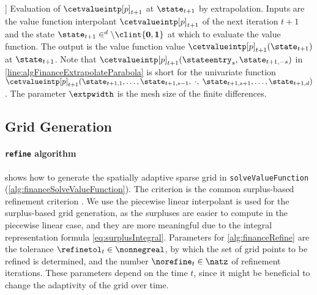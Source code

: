 \begin{algorithm}
  ]{%
    Evaluation of $\cetvalueintp[p]_{t+1}$ at $\state_{t+1}$
    by extrapolation.
    Inputs are
    the value function interpolant $\cetvalueintp[p]_{t+1}$
    of the next iteration $t + 1$ and
    the state $\state_{t+1} \in \real^d \setminus \clint{\*0, \*1}$
    at which to evaluate the value function.
    The output is
    the value function value $\cetvalueintp[p]_{t+1}(\state_{t+1})$
    at $\state_{t+1}$.
    Note that $\cetvalueintp[p]_{t+1}(\stateentry_s, \*\state_{t+1,-s})$
    in \cref{line:algFinanceExtrapolateParabola} is short for
    the univariate function $\cetvalueintp[p]_{t+1}(
      \state_{t+1,1}, \dotsc, \state_{t+1,s-1},\; {\cdot},\;
      \state_{t+1,s+1}, \dotsc, \state_{t+1,d}
    )$.
    The parameter $\extpwidth$ is the mesh size of the finite differences.%
  }%
  \label{alg:financeExtrapolate}%
\end{algorithm}



\subsection{Grid Generation}
\label{sec:826gridGeneration}

\paragraph{\texttt{refine} algorithm}

 shows how to generate the spatially adaptive
sparse grid in \texttt{solveValueFunction}
(\cref{alg:financeSolveValueFunction}).
The criterion is the common surplus-based refinement criterion
\cite{Pflueger10Spatially}.
We use the piecewise linear interpolant is used for the surplus-based
grid generation,
as the surpluses are easier to compute in the piecewise linear case,
and they are more meaningful
due to the integral representation formula \eqref{eq:surplusIntegral}.
Parameters for \cref{alg:financeRefine} are
the tolerance $\refinetol_t \in \nonnegreal$,
by which the set of grid points to be refined is determined, and
the number $\norefine_t \in \natz$ of refinement iterations.
These parameters depend on the time $t$,
since it might be beneficial to change the adaptivity of the
grid over time.

